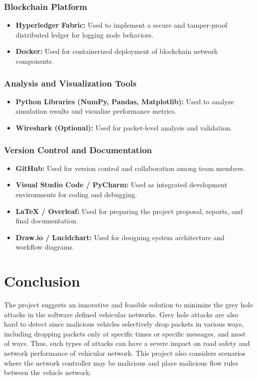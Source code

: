 \documentclass[12pt, a4paper]{report}
\begin{document}
\subsection{Blockchain Platform}
\begin{itemize}
    \item \textbf{Hyperledger Fabric:}
    Used to implement a secure and tamper-proof distributed ledger for logging node behaviors.
    \item \textbf{Docker:}
    Used for containerized deployment of blockchain network components.
\end{itemize}

\subsection{Analysis and Visualization Tools}
\begin{itemize}
    \item \textbf{Python Libraries (NumPy, Pandas, Matplotlib):}
    Used to analyze simulation results and visualize performance metrics.
    \item \textbf{Wireshark (Optional):}
    Used for packet-level analysis and validation.
\end{itemize}

\subsection{Version Control and Documentation}
\begin{itemize}
    \item \textbf{GitHub:}
    Used for version control and collaboration among team members.
    \item \textbf{Visual Studio Code / PyCharm:}
    Used as integrated development environments for coding and debugging.
    \item \textbf{LaTeX / Overleaf:}
    Used for preparing the project proposal, reports, and final documentation.
    \item \textbf{Draw.io / Lucidchart:}
    Used for designing system architecture and workflow diagrams.
\end{itemize}


\chapter{Conclusion}
The project suggests an innovative and feasible solution to minimize the grey hole attacks in the software defined vehicular networks. Grey hole attacks are also hard to detect since malicious vehicles selectively drop packets in various ways, including dropping packets only at specific times or specific messages, and most of ways. Thus, such types of attacks can have a severe impact on road safety and network performance of vehicular network. This project also considers scenarios where the network controller may be malicious and place malicious flow rules between the vehicle network.
\end{document}
